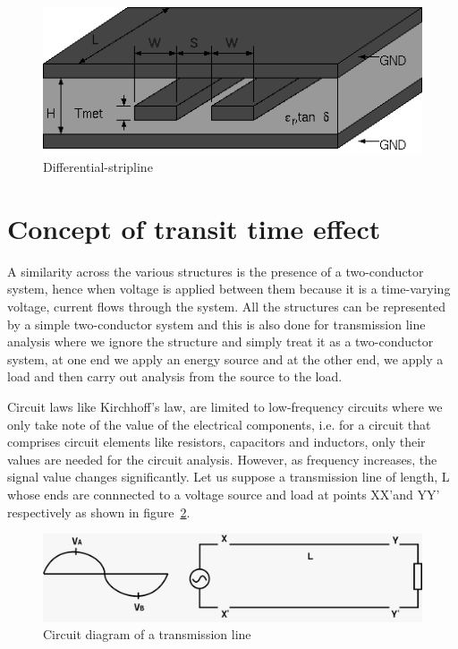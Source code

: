 \begin{figure}[h]
\centering
\includegraphics[width=1\linewidth]{./graphics/stripline}
\caption{ Differential-stripline}
\label{fig:diff-stripline}
\end{figure}

\section{Concept of transit time effect }
A similarity across the various structures is the presence of a two-conductor system, hence when voltage is applied between them because it is a time-varying voltage, current flows through the system. All the structures can be represented by a simple two-conductor system and this is also done for transmission line analysis where we ignore the structure and simply treat it as a two-conductor system, at one end we apply an energy source and at the other end, we apply a load and then carry out analysis from the source to the load.

Circuit laws like Kirchhoff’s law, are limited to low-frequency circuits where we only take note of the value of the electrical components, i.e. for a circuit that comprises circuit elements like resistors, capacitors and inductors, only their values are needed for the circuit analysis. However, as frequency increases, the signal value changes significantly. Let us suppose a transmission line of length, L whose ends are connnected to a voltage source and load at points XX'and YY' respectively as shown in figure~\ref{fig:first}.
\begin{figure}[h]
\centering
\includegraphics[width=1\linewidth]{./graphics/fig2.7}
\caption{Circuit diagram of a transmission line}
\label{fig:first}
\end{figure}

